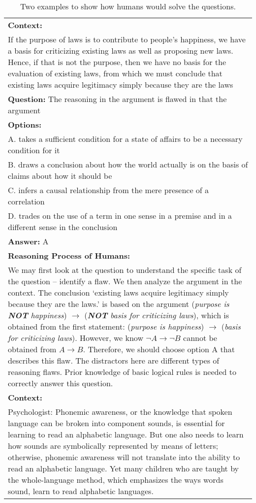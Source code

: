 \documentclass{article} \usepackage{iclr2020_conference,times}
\begin{document}
\begin{table}
    \small
	\centering
	\caption{Two examples to show how humans would solve the questions.}
	\begin{tabular}{|p{\columnwidth}|}
		\hline 
        \textbf{Context:}\\
        If the purpose of laws is to contribute to people's happiness, we have a basis for criticizing existing laws as well as proposing new laws. Hence, if that is not the purpose, then we have no basis for the evaluation of existing laws, from which we must conclude that existing laws acquire legitimacy simply because they are the laws\\
        \textbf{Question:} The reasoning in the argument is flawed in that the argument\\
        \textbf{Options:} \\
        A. takes a sufficient condition for a state of affairs to be a necessary condition for it\\
        B. draws a conclusion about how the world actually is on the basis of claims about how it should be\\
        C. infers a causal relationship from the mere presence of a correlation\\
        D. trades on the use of a term in one sense in a premise and in a different sense in the conclusion\\
        \textbf{Answer: } A\\
        \textbf{Reasoning Process of Humans: }\\
        We may first look at the question to understand the specific task of the question -- identify a flaw. We then analyze the argument in the context. The conclusion `existing laws acquire legitimacy simply because they are the laws.' is based on the argument (\textit{purpose is \textbf{NOT} happiness}) $\rightarrow$ (\textit{\textbf{NOT} basis for criticizing laws}), which is obtained from the first statement: (\textit{purpose is happiness}) $\rightarrow$ (\textit{basis for criticizing laws}). However, we know $\neg A \rightarrow \neg B$ cannot be obtained from $A \rightarrow B$. Therefore, we should choose option A that describes this flaw. The distractors here are different types of reasoning flaws. Prior knowledge of basic logical rules is needed to correctly answer this question.
        \\
		\hline
        \textbf{Context: }\\
        Psychologist: Phonemic awareness, or the knowledge that spoken language can be broken into component sounds, is essential for learning to read an alphabetic language. But one also needs to learn how sounds are symbolically represented by means of letters; otherwise, phonemic awareness will not translate into the ability to read an alphabetic language. Yet many children who are taught by the whole-language method, which emphasizes the ways words sound, learn to read alphabetic languages.\\

\end{tabular}
\end{table}
\end{document}
